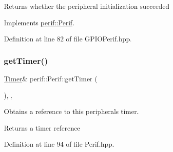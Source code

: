 \begin{DoxyReturn}{Returns}
whether the peripheral initialization succeeded 
\end{DoxyReturn}


Implements \mbox{\hyperlink{classperif_1_1Perif_ae7f1d1a4e9cd2343d51abc4ee21000cf}{perif\+::\+Perif}}.



Definition at line 82 of file G\+P\+I\+O\+Perif.\+hpp.


\begin{DoxyCode}{0}

\end{DoxyCode}
\mbox{\label{classperif_1_1Perif_a29c48598a861d85256c30e28af67f864}} 
\subsubsection{\texorpdfstring{getTimer()}{getTimer()}}
{\footnotesize\ttfamily \mbox{\hyperlink{classTimer}{Timer}}\& perif\+::\+Perif\+::get\+Timer (\begin{DoxyParamCaption}{ }\end{DoxyParamCaption})\hspace{0.3cm}{\ttfamily [inline]}, {\ttfamily [protected]}, {\ttfamily [inherited]}}

Obtains a reference to this peripheral\textquotesingle{}s timer.

\begin{DoxyReturn}{Returns}
a timer reference 
\end{DoxyReturn}


Definition at line 94 of file Perif.\+hpp.


\begin{DoxyCode}{0}

\end{DoxyCode}
\mbox{\label{classperif_1_1GPIOPerif_ae7c93b409fd4d4d49f9f8eddae612b3e}} 
